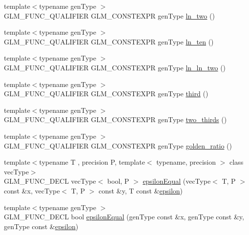 \begin{DoxyCompactItemize}
\item 
{\footnotesize template$<$typename gen\+Type $>$ }\\G\+L\+M\+\_\+\+F\+U\+N\+C\+\_\+\+Q\+U\+A\+L\+I\+F\+I\+E\+R G\+L\+M\+\_\+\+C\+O\+N\+S\+T\+E\+X\+P\+R gen\+Type \hyperlink{group__gtc__constants_ga24f4d27765678116f41a2f336ab7975c}{ln\+\_\+two} ()
\item 
{\footnotesize template$<$typename gen\+Type $>$ }\\G\+L\+M\+\_\+\+F\+U\+N\+C\+\_\+\+Q\+U\+A\+L\+I\+F\+I\+E\+R G\+L\+M\+\_\+\+C\+O\+N\+S\+T\+E\+X\+P\+R gen\+Type \hyperlink{group__gtc__constants_gaf97ebc6c059ffd788e6c4946f71ef66c}{ln\+\_\+ten} ()
\item 
{\footnotesize template$<$typename gen\+Type $>$ }\\G\+L\+M\+\_\+\+F\+U\+N\+C\+\_\+\+Q\+U\+A\+L\+I\+F\+I\+E\+R G\+L\+M\+\_\+\+C\+O\+N\+S\+T\+E\+X\+P\+R gen\+Type \hyperlink{group__gtc__constants_gaca94292c839ed31a405ab7a81ae7e850}{ln\+\_\+ln\+\_\+two} ()
\item 
{\footnotesize template$<$typename gen\+Type $>$ }\\G\+L\+M\+\_\+\+F\+U\+N\+C\+\_\+\+Q\+U\+A\+L\+I\+F\+I\+E\+R G\+L\+M\+\_\+\+C\+O\+N\+S\+T\+E\+X\+P\+R gen\+Type \hyperlink{group__gtc__constants_ga3077c6311010a214b69ddc8214ec13b5}{third} ()
\item 
{\footnotesize template$<$typename gen\+Type $>$ }\\G\+L\+M\+\_\+\+F\+U\+N\+C\+\_\+\+Q\+U\+A\+L\+I\+F\+I\+E\+R G\+L\+M\+\_\+\+C\+O\+N\+S\+T\+E\+X\+P\+R gen\+Type \hyperlink{group__gtc__constants_ga9b4d2f4322edcf63a6737b92a29dd1f5}{two\+\_\+thirds} ()
\item 
{\footnotesize template$<$typename gen\+Type $>$ }\\G\+L\+M\+\_\+\+F\+U\+N\+C\+\_\+\+Q\+U\+A\+L\+I\+F\+I\+E\+R G\+L\+M\+\_\+\+C\+O\+N\+S\+T\+E\+X\+P\+R gen\+Type \hyperlink{group__gtc__constants_ga748cf8642830657c5b7eae04d0a80899}{golden\+\_\+ratio} ()
\item 
{\footnotesize template$<$typename T , precision P, template$<$ typename, precision $>$ class vec\+Type$>$ }\\G\+L\+M\+\_\+\+F\+U\+N\+C\+\_\+\+D\+E\+C\+L vec\+Type$<$ bool, P $>$ \hyperlink{group__gtc__epsilon_gaca9443f217dc36587624247245522331}{epsilon\+Equal} (vec\+Type$<$ T, P $>$ const \&x, vec\+Type$<$ T, P $>$ const \&y, T const \&\hyperlink{group__gtc__constants_ga2a1e57fc5592b69cfae84174cbfc9429}{epsilon})
\item 
{\footnotesize template$<$typename gen\+Type $>$ }\\G\+L\+M\+\_\+\+F\+U\+N\+C\+\_\+\+D\+E\+C\+L bool \hyperlink{group__gtc__epsilon_gaa7f227999ca09e7ca994e8b35aba47bb}{epsilon\+Equal} (gen\+Type const \&x, gen\+Type const \&y, gen\+Type const \&\hyperlink{group__gtc__constants_ga2a1e57fc5592b69cfae84174cbfc9429}{epsilon})

\end{DoxyCompactItemize}
